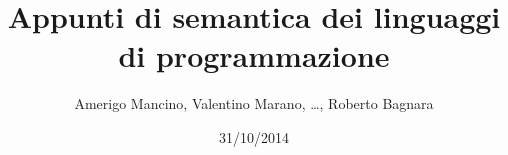 \documentclass[12pt,a4]{book}
\begin{document}
\title{Appunti di semantica dei linguaggi di programmazione}
\author{Amerigo Mancino, Valentino Marano, \dots, Roberto Bagnara}
\date{31/10/2014}

\maketitle

\tableofcontents








\end{document}
